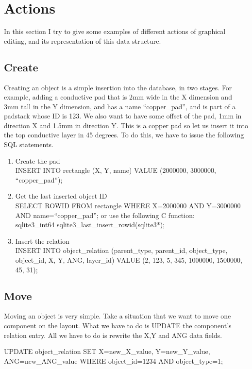 \documentclass[12pt]{article}
\begin{document}
\section{Actions}

In this section I try to give some examples of different actions of graphical
editing, and its representation of this data structure.

\subsection{Create}

Creating an object is a simple insertion into the database, in two stages. For
example, adding a conductive pad that is 2mm wide in the X dimension and 3mm
tall in the Y dimension, and has a name ``copper\_pad'', and is part of a
padstack whose ID is 123. We also want to have some offset of the pad, 1mm in
direction X and 1.5mm in direction Y. This is a copper pad so let us insert it
into the top conductive layer in 45 degrees. To do this, we have to issue the
following SQL statements.

\begin{enumerate}
\item Create the pad\\
INSERT INTO rectangle (X, Y, name) VALUE (2000000, 3000000, ``copper\_pad'');
\item Get the last inserted object ID\\
SELECT ROWID FROM rectangle WHERE X=2000000 AND Y=3000000 AND
name=``copper\_pad''; or use the following C function:\\
sqlite3\_int64 sqlite3\_last\_insert\_rowid(sqlite3*);
\item Insert the relation\\
INSERT INTO object\_relation (parent\_type, parent\_id, object\_type,
object\_id, X, Y, ANG, layer\_id) VALUE (2, 123, 5, 345, 1000000, 1500000, 45,
31);
\end{enumerate}

\subsection{Move}

Moving an object is very simple. Take a situation that we want to move one
component on the layout. What we have to do is UPDATE the component's relation
entry. All we have to do is rewrite the X,Y and ANG data fields.

UPDATE object\_relation SET X=new\_X\_value, Y=new\_Y\_value,
ANG=new\_ANG\_value WHERE object\_id=1234 AND object\_type=1;
\end{document}
